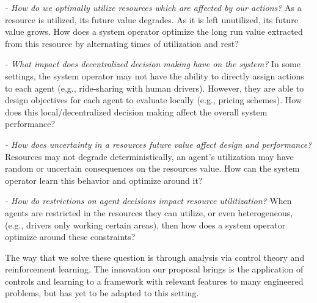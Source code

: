\documentclass[letterpaper, 10 pt, conference]{ieeeconf}
\begin{document}
\noindent\textit{- How do we optimally utilize resources which are affected by our actions?} As a resource is utilized, its future value degrades. As it is left unutilized, its future value grows. How does a system operator optimize the long run value extracted from this resource by alternating times of utilization and rest?

\noindent\textit{- What impact does decentralized decision making have on the system?} In some settings, the system operator may not have the ability to directly assign actions to each agent (e.g., ride-sharing with human drivers). However, they are able to design objectives for each agent to evaluate locally (e.g., pricing schemes). How does this local/decentralized decision making affect the overall system performance?

\noindent\textit{- How does uncertainty in a resources future value affect design and performance?} Resources may not degrade deterministically, an agent's utilization may have random or uncertain consequences on the resources value. How can the system operator learn this behavior and optimize around it?

\noindent\textit{- How do restrictions on agent decisions impact resource utilitization?} When agents are restricted in the resources they can utilize, or even heterogeneous, (e.g., drivers only working certain areas), then how does a system operator optimize around these constraints?


The way that we solve these question is through analysis via control theory and reinforcement learning. 
The innovation our proposal brings is the application of controls and learning to a framework with relevant features to many engineered problems, but has yet to be adapted to this setting.
\end{document}
